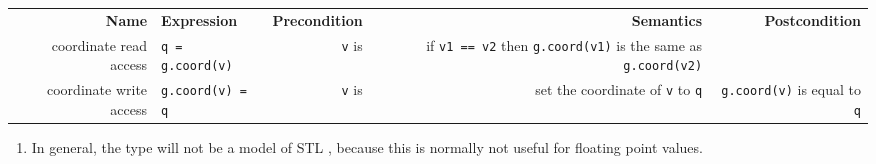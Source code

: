 
\noindent 
 \begin{tabularx}{15cm}{RlRRR} 
   \T \\ \hline 
   \bf  Name    &
   \bf  Expression &
   \bf  Precondition&
   \bf  Semantics &
   \bf  Postcondition
   \\ 
   \hline
    coordinate read access & 
    {\tt q = g.coord(v)} &
    {\tt v} is  &
    if {\tt v1 == v2} then {\tt g.coord(v1)} is the same as
    {\tt g.coord(v2)} &
    \\
    coordinate write access &
    {\tt g.coord(v) = q} &
    {\tt v} is  &
    set the coordinate of {\tt v} to {\tt q} &
    {\tt g.coord(v)} is equal to {\tt q}
    \T \\   \hline
\end{tabularx}

\W{}



\begin{enumerate}
\item {} 
In general, the type  will not be a model
of STL ,
because this is normally not useful for floating point values.
\end{enumerate}



